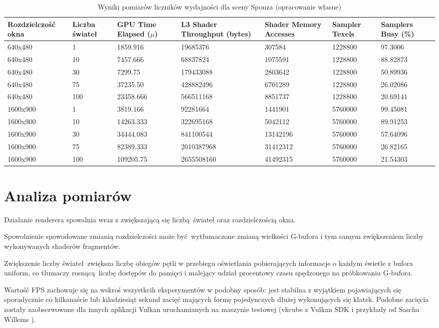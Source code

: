 \begin{table}[!ht]
	\centering
	\begin{tabular}{ |p{2cm}|p{1.1cm}||p{1.7cm}|p{1.8cm}|p{1.5cm}|p{1.3cm}|p{1.3cm}|}
		\hline
		Rozdzielczość okna & Liczba świateł & GPU Time Elapsed ($\mu$) & L3 Shader Throughput (bytes) & Shader Memory Accesses & Sampler Texels & Samplers Busy (\%) \\
		\hline \hline
		640x480 & 1 & 1859.916 & 19685376 & 307584 & 1228800 & 97.3006 \\
		\hline 
		640x480 & 10 & 7457.666 & 68837824 & 1075591 & 1228800 & 88.82873 \\
		\hline 
		640x480 & 30  & 7299.75 & 179433088 & 2803642 & 1228800 & 50.89936 \\
		\hline 
		640x480 & 75 & 37235.50 & 428882496 & 6701289 & 1228800 & 26.02086 \\
		\hline 
		640x480 & 100 & 23358.666 & 566511168 & 8851737 & 1228800 & 20.69141 \\
		\hline 	\hline 
		1600x900 & 1 & 3819.166 & 92281664 & 1441901 & 5760000 & 99.45081 \\
		\hline 
		1600x900 & 10 & 14263.333 & 322695168 & 5042112 & 5760000 & 89.91253 \\
		\hline 
		1600x900 & 30 & 34444.083 & 841100544 & 13142196 & 5760000 & 57.64096 \\
		\hline 
		1600x900 & 75 & 82389.333 & 2010387968 & 31412312 & 5760000 & 26.82165 \\
		\hline 
		1600x900 & 100 & 109205.75 & 2655508160 & 41492315 & 5760000 & 21.54303 \\
		\hline
	\end{tabular}
	\caption{Wyniki pomiarów liczników wydajności dla sceny Sponza (opracowanie własne)} 
	\label{results_sponza}
\end{table}


\section{Analiza pomiarów}

Działanie renderera spowalnia wraz z zwiększającą się liczbą świateł oraz rozdzielczością okna.

Spowolnienie spowodowane zmianią rozdzielczości może być wytłumaczone zmianą wielkości G-bufora i tym samym zwiększeniem liczby wykonywanych shaderów fragmentów.

Zwiększenie liczby świateł zwiększa liczbę obiegów pętli w przebiegu oświetlania pobierających informacje o każdym świetle z bufora uniform, co tłumaczy rosnącą liczbę dostępów do pamięci i malejący udział procentowy czasu spędzonego na próbkowaniu G-bufora.

Wartość FPS zachowuje się na wskroś wszystkcih eksperymentów w podobny sposób: jest stabilna z wyjątkiem pojawiających się sporadycznie co kilkanaście lub kiladziesiąt sekund zacięć mających formę pojedynczych dłużej wykonujących się klatek.
Podobne zacięcia zostały zaobserwowane dla innych aplikacji Vulkan uruchamianych na maszynie testowej (vkcube z Vulkan SDK i przykłady od Sascha Willems \cite{SaschaWillems}).

